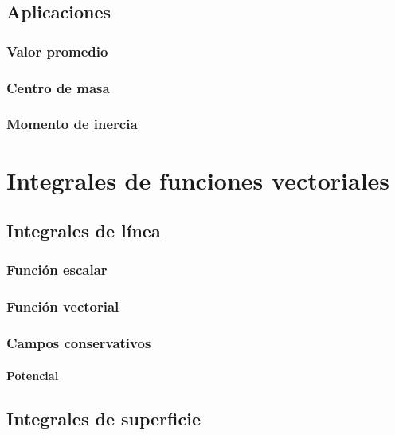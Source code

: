 \documentclass[12pt, fleqn]{report}                             %
\theoremstyle{break}                                            %
\begin{document}
        \section{Aplicaciones}
        
            \subsection{Valor promedio}
            
            \subsection{Centro de masa}
            
            \subsection{Momento de inercia}
        
    \chapter{Integrales de funciones vectoriales}
    
        \section{Integrales de línea}
        
            \subsection{Función escalar}
            
            \subsection{Función vectorial}
            
            \subsection{Campos conservativos}
            
                \subsubsection{Potencial}
        
        \section{Integrales de superficie}
        
\end{document}
